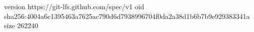 version https://git-lfs.github.com/spec/v1
oid sha256:4004a6c1395463a7625ac790d6d7938996704f0da2a38d1b6b7b9e929383341a
size 262240
